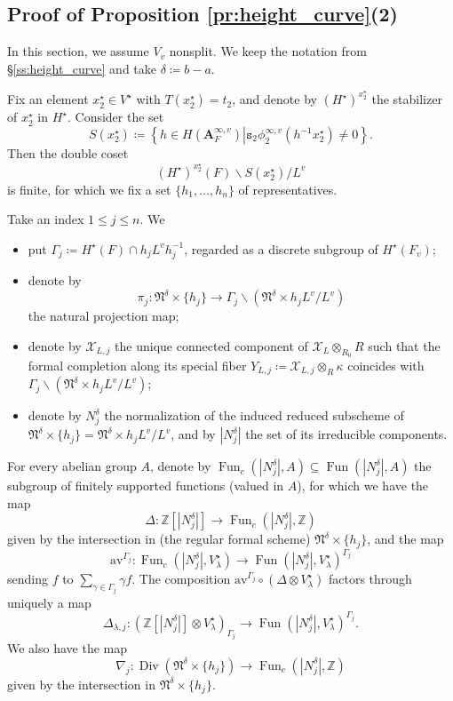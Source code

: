 \documentclass[12pt]{amsart}
\numberwithin{equation}{section}
\theoremstyle{plain}
\theoremstyle{definition}
\theoremstyle{remark}
\renewcommand{\b}[1]{\mathbf{#1}}
\renewcommand{\c}[1]{\mathcal{#1}}
\renewcommand{\d}[1]{\mathbb{#1}}
\newcommand{\f}[1]{\mathfrak{#1}}
\renewcommand{\r}[1]{\mathrm{#1}}
\renewcommand{\(}{\left(}
\renewcommand{\)}{\right)}
\renewcommand{\leq}{\leqslant}
\newcommand{\bA}{\b A}
\newcommand{\cX}{\c X}
\newcommand{\dZ}{\d Z}
\newcommand{\fN}{\f N}
\newcommand{\ts}{\mathtt{s}}
\DeclareMathOperator{\Div}{Div}
\DeclareMathOperator{\Fun}{Fun}
\begin{document}
\subsection{Proof of Proposition \ref{pr:height_curve}(2)}
\label{ss:height_curve_nonsplit}

In this section, we assume $V_v$ nonsplit. We keep the notation from \S\ref{ss:height_curve} and take $\delta\coloneqq b-a$.








Fix an element $x^\star_2\in V^\star$ with $T(x^\star_2)=t_2$, and denote by $(H^\star)^{x^\star_2}$ the stabilizer of $x^\star_2$ in $H^\star$. Consider the set
\[
S(x^\star_2)\coloneqq\left\{h\in H(\bA_F^{\infty,v})\left| \ts_2\phi^{\infty,v}_2(h^{-1}x^\star_2)\neq 0\right.\right\}.
\]
Then the double coset
\[
(H^\star)^{x^\star_2}(F)\backslash S(x^\star_2)/L^v
\]
is finite, for which we fix a set $\{h_1,\dots,h_n\}$ of representatives.

Take an index $1\leq j\leq n$. We
\begin{itemize}
  \item put $\Gamma_j\coloneqq H^\star(F)\cap h_j L^v h_j^{-1}$, regarded as a discrete subgroup of $H^\star(F_v)$;

  \item denote by
      \[
      \pi_j\colon\fN^\delta\times\{h_j\}\to\Gamma_j\backslash\(\fN^\delta\times h_jL^v/L^v\)
      \]
      the natural projection map;

  \item denote by $\cX_{L,j}$ the unique connected component of $\cX_L\otimes_{R_0}R$ such that the formal completion along its special fiber $Y_{L,j}\coloneqq\cX_{L,j}\otimes_R\kappa$ coincides with $\Gamma_j\backslash\(\fN^\delta\times h_jL^v/L^v\)$;

  \item denote by $N^\delta_j$ the normalization of the induced reduced subscheme of $\fN^\delta\times\{h_j\}=\fN^\delta\times h_jL^v/L^v$, and by $|N^\delta_j|$ the set of its irreducible components.
\end{itemize}
For every abelian group $A$, denote by $\Fun_c(|N^\delta_j|,A)\subseteq\Fun(|N^\delta_j|,A)$ the subgroup of finitely supported functions (valued in $A$), for which we have the map
\[
\Delta\colon\dZ[|N^\delta_j|]\to\Fun_c(|N^\delta_j|,\dZ)
\]
given by the intersection in (the regular formal scheme) $\fN^\delta\times\{h_j\}$, and the map
\[
\r{av}^{\Gamma_j}\colon\Fun_c(|N^\delta_j|,V^\star_\lambda)\to\Fun(|N^\delta_j|,V^\star_\lambda)^{\Gamma_j}
\]
sending $f$ to $\sum_{\gamma\in\Gamma_j}\gamma f$. The composition $\r{av}^{\Gamma_j}\circ(\Delta\otimes V^\star_\lambda)$ factors through uniquely a map
\[
\Delta_{\lambda,j}\colon\(\dZ[|N^\delta_j|]\otimes V^\star_\lambda\)_{\Gamma_j}\to\Fun(|N^\delta_j|,V^\star_\lambda)^{\Gamma_j}.
\]
We also have the map
\[
\nabla_j\colon\Div(\fN^\delta\times\{h_j\})\to\Fun_c(|N^\delta_j|,\dZ)
\]
given by the intersection in $\fN^\delta\times\{h_j\}$.
\end{document}
